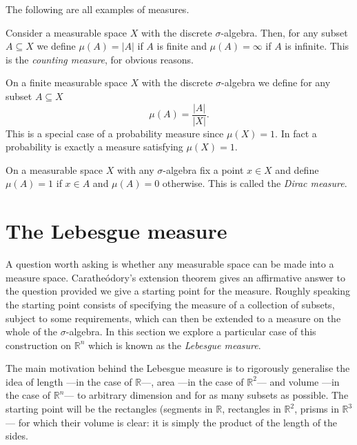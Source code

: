\documentclass[12pt,oneside]{book}
\numberwithin{table}{section}
\numberwithin{equation}{section}
\numberwithin{figure}{section}
\newcommand{\R}{\mathbb{R}}
\newcommand{\abs}[1]{\lvert #1 \rvert}
\begin{document}
\begin{exe}
	The following are all examples of measures.
	\begin{points}
	\item Consider a measurable space \( X \) with the discrete \( \sigma \)-algebra. Then, for any subset \( A \subseteq X \) we define \( \mu(A) = \abs{A} \) if \( A \) is finite and \( \mu(A) = \infty \) if \( A \) is infinite. This is the \emph{counting measure}, for obvious reasons.
	\item On a finite measurable space \( X \) with the discrete \( \sigma \)-algebra we define for any subset \( A \subseteq X \)
		\begin{equation*}
			\mu(A) = \frac{\abs{A}}{\abs{X}}.
		\end{equation*}
		This is a special case of a probability measure since \( \mu(X) = 1 \). In fact a probability is exactly a measure satisfying \( \mu(X) = 1 \).
	\item On a measurable space \( X \) with any \( \sigma \)-algebra fix a point \( x \in X \) and define \( \mu(A) = 1 \) if \( x \in A \) and \( \mu(A) = 0 \) otherwise. This is called the \emph{Dirac measure}.
	\end{points}
\end{exe}

\section{The Lebesgue measure}
A question worth asking is whether any measurable space can be made into a measure space. Caratheódory's extension theorem gives an affirmative answer to the question provided we give a starting point for the measure. Roughly speaking the starting point consists of specifying the measure of a collection of subsets, subject to some requirements, which can then be extended to a measure on the whole of the \( \sigma \)-algebra. In this section we explore a particular case of this construction on \( \R^n \) which is known as the \emph{Lebesgue measure}.

The main motivation behind the Lebesgue measure is to rigorously generalise the idea of length ---in the case of \( \R \)---, area ---in the case of \( \R^2 \)--- and volume ---in the case of \( \R^n \)--- to arbitrary dimension and for as many subsets as possible. The starting point will be the rectangles (segments in \( \R \), rectangles in \( \R^2 \), prisms in \( \R^3 \)--- for which their volume is clear: it is simply the product of the length of the sides. 
\end{document}
